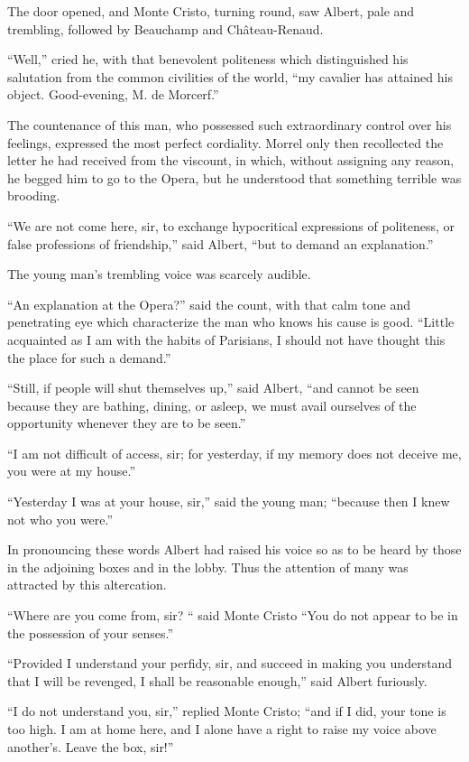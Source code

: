 The door opened, and Monte Cristo, turning round, saw Albert, pale and
trembling, followed by Beauchamp and Château-Renaud.

“Well,” cried he, with that benevolent politeness which distinguished
his salutation from the common civilities of the world, “my cavalier
has attained his object. Good-evening, M. de Morcerf.”

The countenance of this man, who possessed such extraordinary control
over his feelings, expressed the most perfect cordiality. Morrel only
then recollected the letter he had received from the viscount, in
which, without assigning any reason, he begged him to go to the Opera,
but he understood that something terrible was brooding.

“We are not come here, sir, to exchange hypocritical expressions of
politeness, or false professions of friendship,” said Albert, “but to
demand an explanation.”

The young man’s trembling voice was scarcely audible.

“An explanation at the Opera?” said the count, with that calm tone and
penetrating eye which characterize the man who knows his cause is good.
“Little acquainted as I am with the habits of Parisians, I should not
have thought this the place for such a demand.”

“Still, if people will shut themselves up,” said Albert, “and cannot be
seen because they are bathing, dining, or asleep, we must avail
ourselves of the opportunity whenever they are to be seen.”

“I am not difficult of access, sir; for yesterday, if my memory does
not deceive me, you were at my house.”

“Yesterday I was at your house, sir,” said the young man; “because then
I knew not who you were.”

In pronouncing these words Albert had raised his voice so as to be
heard by those in the adjoining boxes and in the lobby. Thus the
attention of many was attracted by this altercation.

“Where are you come from, sir? “ said Monte Cristo “You do not appear
to be in the possession of your senses.”

“Provided I understand your perfidy, sir, and succeed in making you
understand that I will be revenged, I shall be reasonable enough,” said
Albert furiously.

“I do not understand you, sir,” replied Monte Cristo; “and if I did,
your tone is too high. I am at home here, and I alone have a right to
raise my voice above another’s. Leave the box, sir!”

